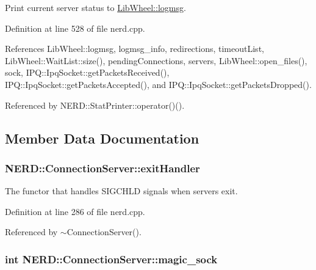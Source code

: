 \-Print current server status to \hyperlink{namespaceLibWheel_af4ca70f4f65b2948701218436516a679}{\-Lib\-Wheel\-::logmsg}. 



\-Definition at line 528 of file nerd.\-cpp.



\-References \-Lib\-Wheel\-::logmsg, logmsg\-\_\-info, redirections, timeout\-List, \-Lib\-Wheel\-::\-Wait\-List\-::size(), pending\-Connections, servers, \-Lib\-Wheel\-::open\-\_\-files(), sock, \-I\-P\-Q\-::\-Ipq\-Socket\-::get\-Packets\-Received(), \-I\-P\-Q\-::\-Ipq\-Socket\-::get\-Packets\-Accepted(), and \-I\-P\-Q\-::\-Ipq\-Socket\-::get\-Packets\-Dropped().



\-Referenced by \-N\-E\-R\-D\-::\-Stat\-Printer\-::operator()().



\subsection{\-Member \-Data \-Documentation}
\hypertarget{classNERD_1_1ConnectionServer_a87fc9625f6d518ffe294e4f759d3cae0}{
\subsubsection[{exit\-Handler}]{ {\bf \-N\-E\-R\-D\-::\-Connection\-Server\-::exit\-Handler}}}
\label{classNERD_1_1ConnectionServer_a87fc9625f6d518ffe294e4f759d3cae0}


\-The functor that handles \-S\-I\-G\-C\-H\-L\-D signals when servers exit. 



\-Definition at line 286 of file nerd.\-cpp.



\-Referenced by $\sim$\-Connection\-Server().

\hypertarget{classNERD_1_1ConnectionServer_a3168fab5ca817d2cd2cb7ca15228440d}{
\subsubsection[{magic\-\_\-sock}]{\setlength{\rightskip}{0pt plus 5cm}int {\bf \-N\-E\-R\-D\-::\-Connection\-Server\-::magic\-\_\-sock}}}
\label{classNERD_1_1ConnectionServer_a3168fab5ca817d2cd2cb7ca15228440d}


